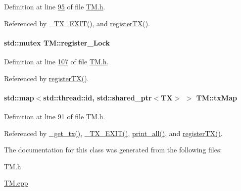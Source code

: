 Definition at line \hyperlink{_t_m_8h_source_l00095}{95} of file \hyperlink{_t_m_8h_source}{T\+M.\+h}.



Referenced by \hyperlink{_t_m_8cpp_source_l00108}{\+\_\+\+T\+X\+\_\+\+E\+X\+I\+T()}, and \hyperlink{_t_m_8cpp_source_l00045}{register\+T\+X()}.

\paragraph[{\texorpdfstring{register\+\_\+\+Lock}{register_Lock}}]{\setlength{\rightskip}{0pt plus 5cm}std\+::mutex T\+M\+::register\+\_\+\+Lock\hspace{0.3cm}{\ttfamily [private]}}\hypertarget{class_t_m_aeb26546681bfe64e21606b8c012bb8c3_aeb26546681bfe64e21606b8c012bb8c3}{}\label{class_t_m_aeb26546681bfe64e21606b8c012bb8c3_aeb26546681bfe64e21606b8c012bb8c3}


Definition at line \hyperlink{_t_m_8h_source_l00107}{107} of file \hyperlink{_t_m_8h_source}{T\+M.\+h}.



Referenced by \hyperlink{_t_m_8cpp_source_l00045}{register\+T\+X()}.

\paragraph[{\texorpdfstring{tx\+Map}{txMap}}]{\setlength{\rightskip}{0pt plus 5cm}std\+::map$<$std\+::thread\+::id, std\+::shared\+\_\+ptr$<${\bf TX}$>$ $>$ T\+M\+::tx\+Map\hspace{0.3cm}{\ttfamily [private]}}\hypertarget{class_t_m_a0333dfa193ea99d7626de74a2b932e9b_a0333dfa193ea99d7626de74a2b932e9b}{}\label{class_t_m_a0333dfa193ea99d7626de74a2b932e9b_a0333dfa193ea99d7626de74a2b932e9b}


Definition at line \hyperlink{_t_m_8h_source_l00091}{91} of file \hyperlink{_t_m_8h_source}{T\+M.\+h}.



Referenced by \hyperlink{_t_m_8cpp_source_l00081}{\+\_\+get\+\_\+tx()}, \hyperlink{_t_m_8cpp_source_l00108}{\+\_\+\+T\+X\+\_\+\+E\+X\+I\+T()}, \hyperlink{_t_m_8cpp_source_l00132}{print\+\_\+all()}, and \hyperlink{_t_m_8cpp_source_l00045}{register\+T\+X()}.



The documentation for this class was generated from the following files\+:\begin{DoxyCompactItemize}
\item 
\hyperlink{_t_m_8h}{T\+M.\+h}\item 
\hyperlink{_t_m_8cpp}{T\+M.\+cpp}\end{DoxyCompactItemize}
